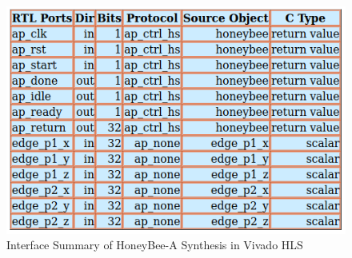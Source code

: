 \begin{figure}[H]
\begin{center}
    \includegraphics[width=0.9\linewidth]{chapters/chapter3/img/HB-A-synthesis.png}
    \caption{Interface Summary of HoneyBee-A Synthesis in Vivado HLS}
    \label{fig:HB-A-synthesis}
\end{center}
\end{figure}

